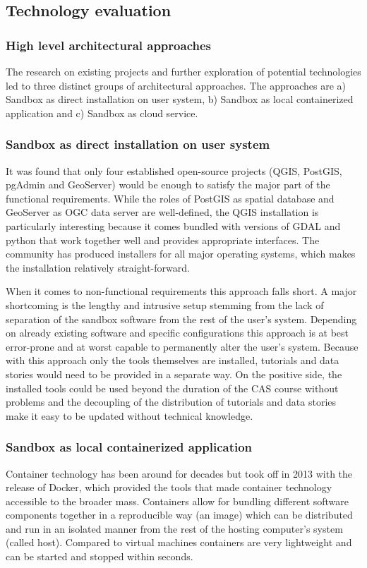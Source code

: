 \documentclass[11pt, a4paper, oneside, parskip=full-]{scrartcl}
\begin{document}
\subsection{Technology evaluation}

\subsubsection{High level architectural approaches}
The research on existing projects and further exploration of potential
technologies led to three distinct groups of architectural approaches. The
approaches are a) Sandbox as direct installation on user system, b) Sandbox as
local containerized application and c) Sandbox as cloud service.

\subsubsection*{Sandbox as direct installation on user system}
It was found that only four established open-source projects (QGIS, PostGIS,
pgAdmin\cite{pgadmin} and GeoServer\cite{geoserver}) would be enough to satisfy
the major part of the functional requirements. While the roles of PostGIS as
spatial database and GeoServer as OGC data server are well-defined, the QGIS
installation is particularly interesting because it comes bundled with versions
of GDAL\cite{gdal} and python that work together well and provides appropriate
interfaces. The community has produced installers for all major operating
systems, which makes the installation relatively straight-forward.

When it comes to non-functional requirements this approach falls short. A major
shortcoming is the lengthy and intrusive setup stemming from the lack of
separation of the sandbox software from the rest of the user's system. Depending
on already existing software and specific configurations this approach is at
best error-prone and at worst capable to permanently alter the user's system.
Because with this approach only the tools themselves are installed, tutorials
and data stories would need to be provided in a separate way. On the positive
side, the installed tools could be used beyond the duration of the CAS course
without problems and the decoupling of the distribution of tutorials and data
stories make it easy to be updated without technical knowledge.

\subsubsection*{Sandbox as local containerized application}
Container technology has been around for decades but took off in 2013 with the
release of Docker, which provided the tools that made container technology
accessible to the broader mass. Containers allow for bundling different software
components together in a reproducible way (an image) which can be distributed
and run in an isolated manner from the rest of the hosting computer's system
(called host). Compared to virtual machines containers are very lightweight and
can be started and stopped within seconds.
\end{document}
